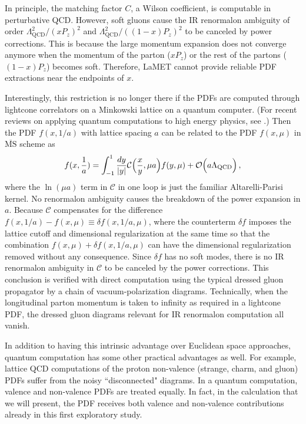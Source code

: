\documentclass[aps,prd,twocolumn,tightenlines,superscriptaddress,
nofootinbib,preprintnumbers]{revtex4-1}
\begin{document}
In principle, the matching factor $C$, a Wilson coefficient, is computable in perturbative QCD. However, soft gluons cause the IR renormalon ambiguity \cite{Braun:2018brg}
of order $\Lambda_{\mathrm{QCD}}^2/ (xP_z)^2$ and $\Lambda_{\mathrm{QCD}}^2/ ((1-x)P_z)^2$ to be canceled by power corrections. This is because the large momentum expansion does not converge anymore when the momentum of the parton ($x P_z$) or the rest of the partons ($(1-x) P_z$) becomes soft. Therefore, LaMET cannot provide reliable PDF extractions near the endpoints of $x$.      

Interestingly, this restriction is no longer there if the PDFs are computed through lightcone correlators on a Minkowski lattice on a quantum computer. (For recent reviews on applying quantum computations to high energy physics, see \cite{Klco:2021lap,Bauer:2022hpo,Bauer:2023qgm,Beck:2023xhh}.) Then the PDF $f(x,1/a)$ with lattice spacing $a$ can be related to the PDF $f(x,\mu)$ in $\overline{\text{MS}}$ scheme as
\begin{align}\label{matching2}
    f(x,\frac{1}{a}) =  \int_{-1}^1 {dy\over |y|} \mathcal{C}\Big({x\over y}, {\mu a}\Big)  f(y,\mu) 
    + {\cal O}\Big( a \Lambda_{\mathrm{QCD}}\Big)\,,
\end{align}
where the $\ln{(\mu a)}$ term in $\mathcal{C}$ in one loop is just the familiar Altarelli-Parisi kernel. No renormalon ambiguity causes the breakdown of the power expansion in $a$. Because $\mathcal{C}$ compensates for the difference
$f(x,1/a) - f(x,\mu) \equiv \delta f(x,1/a,\mu)$, where the counterterm $\delta f$ imposes the lattice cutoff and dimensional regularization at the same time so that the combination $f(x,\mu)+\delta f(x,1/a,\mu)$ 
can have the dimensional regularization removed without any consequence. Since $\delta f$ has no soft modes, there is no IR renormalon ambiguity in $\mathcal{C}$ to be canceled by the power corrections. This conclusion is verified with direct computation using the typical dressed gluon propagator by a chain of vacuum-polarization diagrams. Technically, when the longitudinal parton momentum is taken to infinity as required in a lightcone PDF, the dressed gluon diagrams relevant for IR renormalon computation all vanish. 

In addition to having this intrinsic advantage over Euclidean space approaches, quantum computation has some other practical advantages as well. For example, lattice QCD computations of the proton non-valence (strange, charm, and gluon) PDFs suffer from the noisy  ``disconnected" diagrams. In a quantum computation, valence and non-valence PDFs are treated equally. In fact, in the calculation that we will present, the PDF receives both valence and non-valence contributions already in this first exploratory study. 
\end{document}

